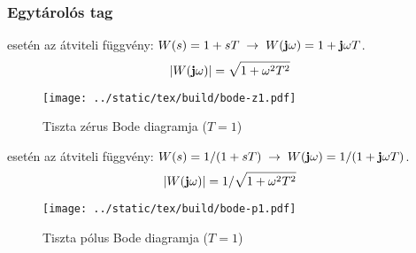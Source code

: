 \documentclass[../main.tex]{subfiles}
\begin{document}
\subsubsection*{Egytárolós tag}


 esetén az átviteli függvény: $W(s) = 1 + sT \; \rightarrow \; W(\mathbf{j} \omega) = 1 + \mathbf{j} \omega T$.
\[
  |W(\mathbf{j} \omega)| = \sqrt{1 + \omega^2 T^2}
\]

\begin{figure}[H]
  \centering
  \texttt{[image: ../static/tex/build/bode-z1.pdf]} 
  \caption{Tiszta zérus Bode diagramja ($T = 1$)}
  \label{fig:bode-1z}
\end{figure}


 esetén az átviteli függvény: $W(s) = 1/(1 + sT) \; \rightarrow \; W(\mathbf{j} \omega) =  1/(1 + \mathbf{j} \omega T)$.
\[
  |W(\mathbf{j} \omega)| = 1 / \sqrt{1 + \omega^2 T^2}
\]

\begin{figure}[H]
  \centering
  \texttt{[image: ../static/tex/build/bode-p1.pdf]} 
  \caption{Tiszta pólus Bode diagramja ($T = 1$)}
  \label{fig:bode-1p}
\end{figure}
\end{document}
